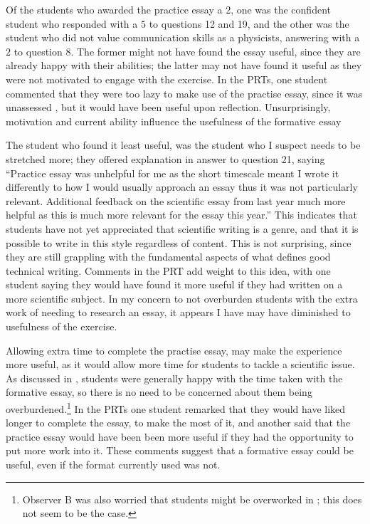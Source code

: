 Of the students who awarded the practice essay a $2$, one was the confident student who responded with a $5$ to questions 12 and 19, and the other was the student who did not value communication skills as a physicists, answering with a $2$ to question 8. The former might not have found the essay useful, since they are already happy with their abilities; the latter may not have found it useful as they were not motivated to engage with the exercise. In the PRTs, one student commented that they were too lazy to make use of the practise essay, since it was unassessed \citep[chapter 1]{Irons2008}, but it would have been useful upon reflection. Unsurprisingly, motivation and current ability influence the usefulness of the formative essay

The student who found it least useful, was the student who I suspect needs to be stretched more; they offered explanation in answer to question 21, saying ``Practice essay was unhelpful for me as the short timescale meant I wrote it differently to how I would usually approach an essay thus it was not particularly relevant. Additional feedback on the scientific essay from last year much more helpful as this is much more relevant for the essay this year.'' This indicates that students have not yet appreciated that scientific writing is a genre, and that it is possible to write in this style regardless of content. This is not surprising, since they are still grappling with the fundamental aspects of what defines good technical writing. Comments in the PRT add weight to this idea, with one student saying they would have found it more useful if they had written on a more scientific subject. In my concern to not overburden students with the extra work of needing to research an essay, it appears I have may have diminished to usefulness of the exercise.

Allowing extra time to complete the practise essay, may make the experience more useful, as it would allow more time for students to tackle a scientific issue. As discussed in , students were generally happy with the time taken with the formative essay, so there is no need to be concerned about them being overburdened.\footnote{Observer B was also worried that students might be overworked in ; this does not seem to be the case.} In the PRTs one student remarked that they would have liked longer to complete the essay, to make the most of it, and another said that the practice essay would have been been more useful if they had the opportunity to put more work into it. These comments suggest that a formative essay could be useful, even if the format currently used was not.

